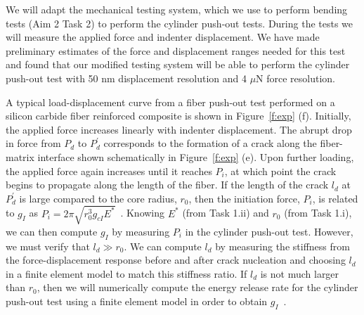 \documentclass[10pt,letterpaper]{article}
\begin{document}
        We will adapt the mechanical testing system, which we use to perform bending tests (Aim 2 Task 2) to perform the cylinder push-out tests. During the tests we will measure the applied force and indenter displacement.
        We have made preliminary estimates of the force and displacement ranges needed for this test and found that our modified testing system will be able to perform the cylinder push-out test with 50 nm displacement resolution and 4 $\mu$N force resolution.

        A typical load-displacement curve from a fiber push-out test performed on a silicon carbide fiber reinforced composite is shown in Figure~\ref{f:exp} (f).
        Initially, the applied force increases linearly with indenter displacement.
        The abrupt drop in force from $P_d$ to $P_d^\prime$ corresponds to the formation of a crack along the fiber-matrix interface shown schematically in Figure~\ref{f:exp} (e).
        Upon further loading, the  applied force again increases until it reaches $P_i$, at which point the crack begins to propagate along the length of the fiber.
        If the length of the crack $l_d$ at $P_d^\prime$ is large compared to the core radius, $r_0$, then the initiation force, $P_i$, is related to $g_{I}$ as $P_i=2\pi \sqrt{r_0^3 g_{cI} E^*}$~\cite{outwater1970fracture, kerans1991theoretical, liang1993mechanics}.
        Knowing $E^*$ (from Task 1.ii) and $r_0$ (from Task 1.i), we can then compute $g_{I}$ by measuring $P_i$ in the cylinder push-out test. However, we must verify that $l_d \gg r_0$.
        We can compute $l_d$ by measuring the stiffness from the force-displacement response before and after crack nucleation and choosing $l_d$ in a finite element model to match this stiffness ratio.
        If $l_d$ is not much larger than $r_0$, then we will numerically compute the energy release rate for the cylinder push-out test using a finite element model in order to obtain $g_I$~\cite{moran1987crack}.
\end{document}
